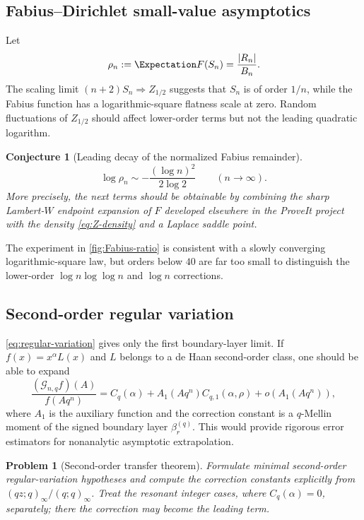 \documentclass[11pt,oneside]{article}
\numberwithin{equation}{section}
\newtheorem{conjecture}[conjecture]{Conjecture}
\newtheorem{problem}[problem]{Problem}
\theoremstyle{definition}
\theoremstyle{remark}
\newcommand{\Gc}{\mathcal G}
\begin{document}
\subsection{Fabius--Dirichlet small-value asymptotics}

Let
\[
 \rho_n:=\Expectation F(S_n)=\frac{|R_n|}{B_n}.
\]
The scaling limit $(n+2)S_n\Rightarrow Z_{1/2}$ suggests that $S_n$ is of order
$1/n$, while the Fabius function has a logarithmic-square flatness scale at
zero.  Random fluctuations of $Z_{1/2}$ should affect lower-order terms but not
the leading quadratic logarithm.

\begin{conjecture}[Leading decay of the normalized Fabius remainder]
\begin{equation}
 \log\rho_n
 \sim-\frac{(\log n)^2}{2\log2}
 \qquad(n\to\infty).
 \label{eq:Fabius-rho-conjecture}
\end{equation}
More precisely, the next terms should be obtainable by combining the sharp
Lambert-$W$ endpoint expansion of $F$ developed elsewhere in the ProveIt
project with the density \eqref{eq:Z-density} and a Laplace saddle point.
\end{conjecture}

The experiment in \cref{fig:Fabius-ratio} is consistent with a slowly
converging logarithmic-square law, but orders below $40$ are far too small to
distinguish the lower-order $\log n\log\log n$ and $\log n$ corrections.

\subsection{Second-order regular variation}

\cref{eq:regular-variation} gives only the first boundary-layer limit.  If
$f(x)=x^\alpha L(x)$ and $L$ belongs to a de Haan second-order class, one should
be able to expand
\[
 \frac{(\Gc_{n,q}f)(A)}{f(Aq^n)}
 =C_q(\alpha)+A_1(Aq^n)C_{q,1}(\alpha,\rho)+o(A_1(Aq^n)),
\]
where $A_1$ is the auxiliary function and the correction constant is a
$q$-Mellin moment of the signed boundary layer $\beta_r^{(q)}$.  This would
provide rigorous error estimators for nonanalytic asymptotic extrapolation.

\begin{problem}[Second-order transfer theorem]
Formulate minimal second-order regular-variation hypotheses and compute the
correction constants explicitly from
$(qz;q)_\infty/(q;q)_\infty$.  Treat the resonant integer cases, where
$C_q(\alpha)=0$, separately; there the correction may become the leading term.
\end{problem}
\end{document}
